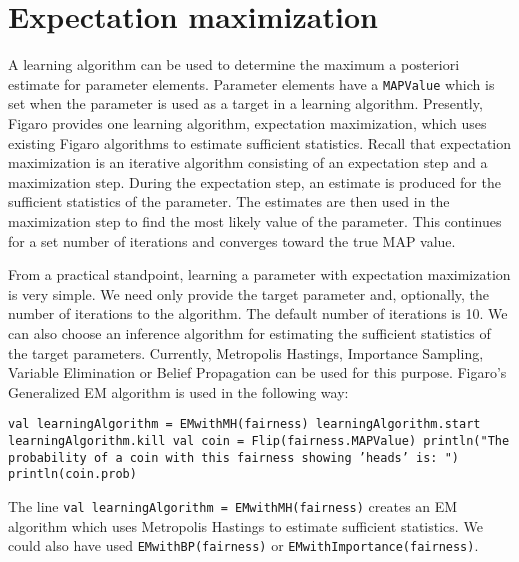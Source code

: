 \section{Expectation maximization}

A learning algorithm can be used to determine the maximum a posteriori estimate for parameter elements. Parameter elements have a \texttt{MAPValue} which is set when the parameter is used as a target in a learning algorithm. Presently, Figaro provides one learning algorithm, expectation maximization, which uses existing Figaro algorithms to estimate sufficient statistics. Recall that expectation maximization is an iterative algorithm consisting of an expectation step and a maximization step. During the expectation step, an estimate is produced for the sufficient statistics of the parameter. The estimates are then used in the maximization step to find the most likely value of the parameter. This continues for a set number of iterations and converges toward the true MAP value.

From a practical standpoint, learning a parameter with expectation maximization is very simple. We need only provide the target parameter and, optionally, the number of iterations to the algorithm. The default number of iterations is 10. We can also choose an inference algorithm for estimating the sufficient statistics of the target parameters. Currently, Metropolis Hastings, Importance Sampling, Variable Elimination or Belief Propagation can be used for this purpose. Figaro's Generalized EM algorithm is used in the following way:

\begin{flushleft}
\texttt{val learningAlgorithm = EMwithMH(fairness)
\newline learningAlgorithm.start
\newline learningAlgorithm.kill
\newline 
\newline val coin = Flip(fairness.MAPValue)
\newline println("The probability of a coin with this fairness showing
'heads' is: ")
\newline println(coin.prob)
}
\end{flushleft}

The line \texttt{val learningAlgorithm = EMwithMH(fairness)} creates an EM algorithm which uses Metropolis Hastings to estimate sufficient statistics. We could also have used \texttt{EMwithBP(fairness)} or 
\texttt{EMwithImportance(fairness)}. 

